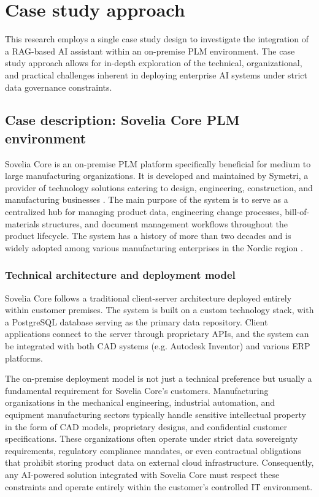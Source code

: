 \section{Case study approach}
\label{sec:case-study-approach}

This research employs a single case study design \parencite{yin_case_2018} to investigate the integration of a RAG-based AI assistant within an on-premise PLM environment. The case study approach allows for in-depth exploration of the technical, organizational, and practical challenges inherent in deploying enterprise AI systems under strict data governance constraints.

\subsection{Case description: Sovelia Core PLM environment}
\label{subsec:case-description}

Sovelia Core is an on-premise PLM platform specifically beneficial for medium to large manufacturing organizations. It is developed and maintained by Symetri, a provider of technology solutions catering to design, engineering, construction, and manufacturing businesses \parencite{noauthor_symetri_nodate}. The main purpose of the system is to serve as a centralized hub for managing product data, engineering change processes, bill-of-materials structures, and document management workflows throughout the product lifecycle. The system has a history of more than two decades and is widely adopted among various manufacturing enterprises in the Nordic region \parencite{noauthor_about_nodate}.

\subsubsection{Technical architecture and deployment model}

Sovelia Core follows a traditional client-server architecture deployed entirely within customer premises. The system is built on a custom technology stack, with a PostgreSQL database serving as the primary data repository. Client applications connect to the server through proprietary APIs, and the system can be integrated with both CAD systems (e.g. Autodesk Inventor) and various ERP platforms.

The on-premise deployment model is not just a technical preference but usually a fundamental requirement for Sovelia Core's customers. Manufacturing organizations in the mechanical engineering, industrial automation, and equipment manufacturing sectors typically handle sensitive intellectual property in the form of CAD models, proprietary designs, and confidential customer specifications. These organizations often operate under strict data sovereignty requirements, regulatory compliance mandates, or even contractual obligations that prohibit storing product data on external cloud infrastructure. Consequently, any AI-powered solution integrated with Sovelia Core must respect these constraints and operate entirely within the customer's controlled IT environment.

